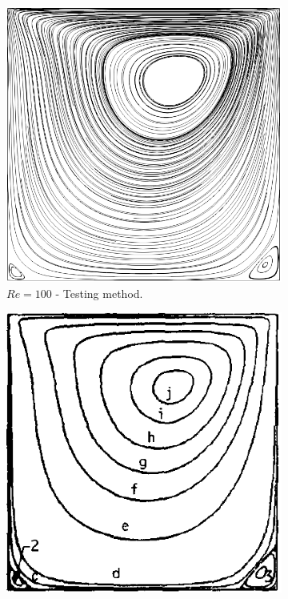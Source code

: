 \begin{figure}[H] 
    \centering
    \begin{subfigure}[t]{0.450\textwidth}
        \includegraphics[width=\textwidth]{Images/Sub-figures_Example/cavity_100_streamlines.png}
        \caption*{$Re = 100$ - Testing method.}
    \end{subfigure}
    \begin{subfigure}[t]{0.441\textwidth}
        \includegraphics[width=\textwidth]{Images/Sub-figures_Example/cavity_100_streamlines_ghia.png}

\end{subfigure}
\end{figure}

